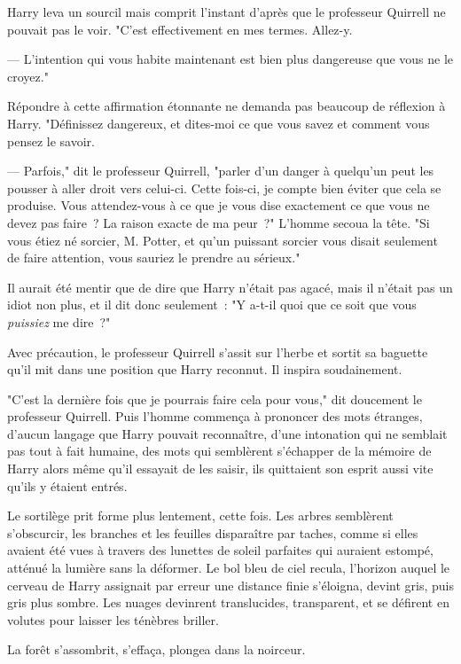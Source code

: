 Harry leva un sourcil mais comprit l'instant d'après que le professeur Quirrell ne pouvait pas le voir. "C'est effectivement en mes termes. Allez-y.

--- L'intention qui vous habite maintenant est bien plus dangereuse que vous ne le croyez."

Répondre à cette affirmation étonnante ne demanda pas beaucoup de réflexion à Harry. "Définissez dangereux, et dites-moi ce que vous savez et comment vous pensez le savoir.

--- Parfois," dit le professeur Quirrell, "parler d'un danger à quelqu'un peut les pousser à aller droit vers celui-ci. Cette fois-ci, je compte bien éviter que cela se produise. Vous attendez-vous à ce que je vous dise exactement ce que vous ne devez pas faire~? La raison exacte de ma peur~?" L'homme secoua la tête. "Si vous étiez né sorcier, M. Potter, et qu'un puissant sorcier vous disait seulement de faire attention, vous sauriez le prendre au sérieux."

Il aurait été mentir que de dire que Harry n'était pas agacé, mais il n'était pas un idiot non plus, et il dit donc seulement~: "Y a-t-il quoi que ce soit que vous \emph{puissiez} me dire~?"

Avec précaution, le professeur Quirrell s'assit sur l'herbe et sortit sa baguette qu'il mit dans une position que Harry reconnut. Il inspira soudainement.

"C'est la dernière fois que je pourrais faire cela pour vous," dit doucement le professeur Quirrell. Puis l'homme commença à prononcer des mots étranges, d'aucun langage que Harry pouvait reconnaître, d'une intonation qui ne semblait pas tout à fait humaine, des mots qui semblèrent s'échapper de la mémoire de Harry alors même qu'il essayait de les saisir, ils quittaient son esprit aussi vite qu'ils y étaient entrés.

Le sortilège prit forme plus lentement, cette fois. Les arbres semblèrent s'obscurcir, les branches et les feuilles disparaître par taches, comme si elles avaient été vues à travers des lunettes de soleil parfaites qui auraient estompé, atténué la lumière sans la déformer. Le bol bleu de ciel recula, l'horizon auquel le cerveau de Harry assignait par erreur une distance finie s'éloigna, devint gris, puis gris plus sombre. Les nuages devinrent translucides, transparent, et se défirent en volutes pour laisser les ténèbres briller.

La forêt s'assombrit, s'effaça, plongea dans la noirceur.

